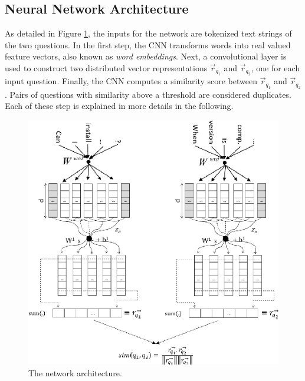 \documentclass[10pt,twocolumn,letterpaper]{article}
\begin{document}
\subsection{Neural Network Architecture}
As detailed in Figure \ref{fig:network}, the inputs for the network are tokenized text strings of the two questions. In the first step, the CNN transforms words into real valued feature vectors, also known as \emph{word embeddings}. Next, a convolutional layer is used to construct two distributed vector representations $\vec{r}_{q_1}$ and $\vec{r}_{q_2}$, one for each input question. Finally, the CNN computes a similarity score between $\vec{r}_{q_1}$ and $\vec{r}_{q_2}$. Pairs of questions with similarity above a threshold are considered duplicates. Each of these step is explained in more details in the following.
\begin{figure}[t]
\begin{center}
\includegraphics[width=0.8\linewidth]{img/network.png}
\end{center}
\caption{The network architecture.}
\label{fig:network}
\end{figure}
\end{document}
